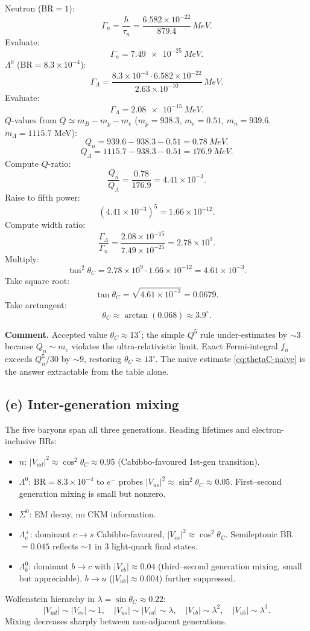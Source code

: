 \documentclass[11pt]{article}
\begin{document}
Neutron (BR$=1$):
\[
\Gamma_n=\frac{\hbar}{\tau_n}=\frac{6.582\times 10^{-22}}{879.4}\,\si{MeV}.
\]
Evaluate:
\[
\Gamma_n=\SI{7.49e-25}{MeV}.
\]
$\Lambda^{0}$ (BR$=8.3\times 10^{-4}$):
\[
\Gamma_\Lambda=\frac{8.3\times 10^{-4}\cdot 6.582\times 10^{-22}}{2.63\times 10^{-10}}\,\si{MeV}.
\]
Evaluate:
\[
\Gamma_\Lambda=\SI{2.08e-15}{MeV}.
\]
$Q$-values from $Q\simeq m_B-m_p-m_e$ ($m_p=938.3$, $m_e=0.51$, $m_n=939.6$, $m_\Lambda=1115.7$ MeV):
\[
Q_n=939.6-938.3-0.51=\SI{0.78}{MeV}.
\]
\[
Q_\Lambda=1115.7-938.3-0.51=\SI{176.9}{MeV}.
\]
Compute $Q$-ratio:
\[
\frac{Q_n}{Q_\Lambda}=\frac{0.78}{176.9}=4.41\times 10^{-3}.
\]
Raise to fifth power:
\[
(4.41\times 10^{-3})^{5}=1.66\times 10^{-12}.
\]
Compute width ratio:
\[
\frac{\Gamma_\Lambda}{\Gamma_n}=\frac{2.08\times 10^{-15}}{7.49\times 10^{-25}}=2.78\times 10^{9}.
\]
Multiply:
\[
\tan^{2}\theta_{C}=2.78\times 10^{9}\cdot 1.66\times 10^{-12}=4.61\times 10^{-3}.
\]
Take square root:
\[
\tan\theta_{C}=\sqrt{4.61\times 10^{-3}}=0.0679.
\]
Take arctangent:
\begin{equation}
\boxed{\;\theta_{C}\approx \arctan(0.068)\approx 3.9^{\circ}.\;}
\label{eq:thetaC-naive}
\end{equation}

\textbf{Comment.} Accepted value $\theta_C\approx 13^\circ$; the simple $Q^5$ rule under-estimates by $\sim 3$ because $Q_n\sim m_e$ violates the ultra-relativistic limit. Exact Fermi-integral $f_n$ exceeds $Q_n^5/30$ by $\sim 9$, restoring $\theta_C\approx 13^\circ$. The naive estimate \eqref{eq:thetaC-naive} is the answer extractable from the table alone.

\subsection*{(e) Inter-generation mixing}

The five baryons span all three generations. Reading lifetimes and electron-inclusive BRs:
\begin{itemize}
\item $n$: $|V_{ud}|^{2}\approx \cos^{2}\theta_{C}\approx 0.95$ (Cabibbo-favoured 1st-gen transition).
\item $\Lambda^{0}$: BR$=8.3\times 10^{-4}$ to $e^{-}$ probes $|V_{us}|^{2}\approx \sin^{2}\theta_C\approx 0.05$. First--second generation mixing is small but nonzero.
\item $\Sigma^{0}$: EM decay, no CKM information.
\item $\Lambda_c^{+}$: dominant $c\to s$ Cabibbo-favoured, $|V_{cs}|^{2}\approx \cos^{2}\theta_C$. Semileptonic BR$=0.045$ reflects $\sim 1$ in 3 light-quark final states.
\item $\Lambda_b^{0}$: dominant $b\to c$ with $|V_{cb}|\approx 0.04$ (third--second generation mixing, small but appreciable). $b\to u$ ($|V_{ub}|\approx 0.004$) further suppressed.
\end{itemize}
Wolfenstein hierarchy in $\lambda=\sin\theta_C\approx 0.22$:
\begin{equation}
|V_{ud}|\sim|V_{cs}|\sim 1,\quad |V_{us}|\sim|V_{cd}|\sim\lambda,\quad |V_{cb}|\sim\lambda^{2},\quad |V_{ub}|\sim\lambda^{3}.
\label{eq:wolfenstein}
\end{equation}
Mixing decreases sharply between non-adjacent generations.
\end{document}

